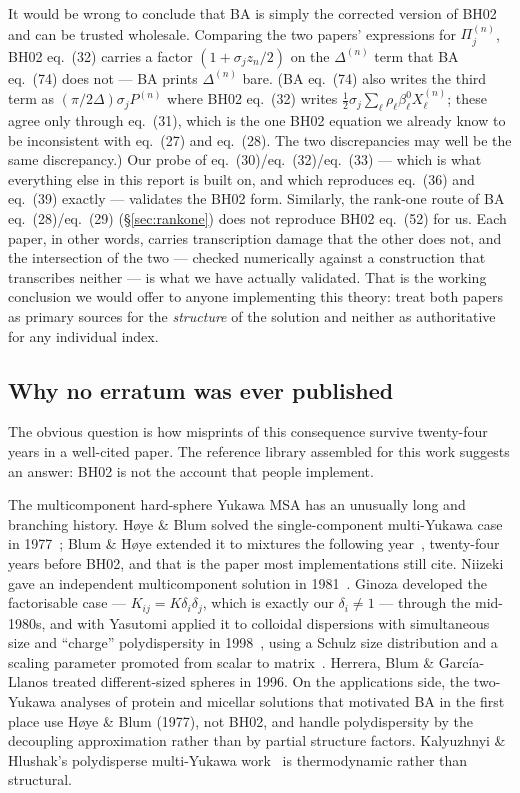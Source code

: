 \documentclass[11pt,a4paper]{article}
\newcommand{\eqBH}[1]{eq.~(#1)}
\begin{document}
It would be wrong to conclude that BA is simply the corrected version of BH02
and can be trusted wholesale. Comparing the two papers' expressions for
$\Pi^{(n)}_j$, BH02 \eqBH{32} carries a factor $(1+\sigma_jz_n/2)$ on the
$\Delta^{(n)}$ term that BA \eqBH{74} does not --- BA prints $\Delta^{(n)}$
bare. (BA \eqBH{74} also writes the third term as
$(\pi/2\Delta)\sigma_jP^{(n)}$ where BH02 \eqBH{32} writes
$\tfrac12\sigma_j\sum_\ell\rho_\ell\beta^0_\ell X^{(n)}_\ell$; these agree only
through \eqBH{31}, which is the one BH02 equation we already know to be
inconsistent with \eqBH{27} and \eqBH{28}. The two discrepancies may well be
the same discrepancy.) Our probe of
\eqBH{30}/\eqBH{32}/\eqBH{33} --- which is what everything else in this report
is built on, and which reproduces \eqBH{36} and \eqBH{39} exactly --- validates
the BH02 form. Similarly, the rank-one route of BA \eqBH{28}/\eqBH{29}
(\S\ref{sec:rankone}) does not reproduce BH02 \eqBH{52} for us. Each paper, in
other words, carries transcription damage that the other does not, and the
intersection of the two --- checked numerically against a construction that
transcribes neither --- is what we have actually validated. That is the working
conclusion we would offer to anyone implementing this theory: treat both papers
as primary sources for the \emph{structure} of the solution and neither as
authoritative for any individual index.

\subsection{Why no erratum was ever published}

The obvious question is how misprints of this consequence survive
twenty-four years in a well-cited paper. The reference library assembled for
this work suggests an answer: BH02 is not the account that people implement.

The multicomponent hard-sphere Yukawa MSA has an unusually long and branching
history. Høye \& Blum solved the single-component multi-Yukawa case in
1977~\cite{HoyeBlum1977}; Blum \& Høye extended it to mixtures the following
year~\cite{BlumHoye1978}, twenty-four years before BH02, and that is the paper
most implementations still cite. Niizeki gave an independent multicomponent
solution in 1981~\cite{Niizeki1981}. Ginoza developed the factorisable case
--- $K_{ij}=K\delta_i\delta_j$, which is exactly our $\delta_i\neq1$ --- through
the mid-1980s, and with Yasutomi applied it to colloidal dispersions with
simultaneous size and ``charge'' polydispersity in 1998~\cite{GinozaYasutomi1998},
using a Schulz size distribution and a scaling parameter promoted from scalar
to matrix~\cite{GinozaYasutomi1997}. Herrera, Blum \& García-Llanos treated
different-sized spheres in 1996. On the applications side, the two-Yukawa
analyses of protein and micellar solutions that motivated BA in the first place
use Høye \& Blum (1977), not BH02, and handle polydispersity by the decoupling
approximation rather than by partial structure factors. Kalyuzhnyi \& Hlushak's
polydisperse multi-Yukawa work~\cite{Kalyuzhnyi2006} is thermodynamic rather
than structural.
\end{document}
